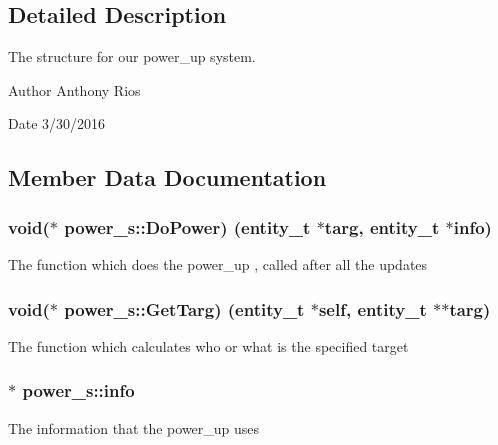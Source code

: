\subsection{Detailed Description}
The structure for our power\+\_\+up system.

\begin{DoxyAuthor}{Author}
Anthony Rios 
\end{DoxyAuthor}
\begin{DoxyDate}{Date}
3/30/2016 
\end{DoxyDate}


\subsection{Member Data Documentation}
\subsubsection[{\texorpdfstring{Do\+Power}{DoPower}}]{\setlength{\rightskip}{0pt plus 5cm}void($\ast$ power\+\_\+s\+::\+Do\+Power) ({\bf entity\+\_\+t} $\ast$targ, {\bf entity\+\_\+t} $\ast${\bf info})}\hypertarget{structpower__s_a098d549981525670c9a0547af9252323}{}\label{structpower__s_a098d549981525670c9a0547af9252323}
The function which does the power\+\_\+up , called after all the updates 
\subsubsection[{\texorpdfstring{Get\+Targ}{GetTarg}}]{\setlength{\rightskip}{0pt plus 5cm}void($\ast$ power\+\_\+s\+::\+Get\+Targ) ({\bf entity\+\_\+t} $\ast$self, {\bf entity\+\_\+t} $\ast$$\ast$targ)}\hypertarget{structpower__s_a28669829daf806ea3571ea2d625bd8a3}{}\label{structpower__s_a28669829daf806ea3571ea2d625bd8a3}
The function which calculates who or what is the specified target 
\subsubsection[{\texorpdfstring{info}{info}}]{$\ast$ power\+\_\+s\+::info}\hypertarget{structpower__s_a32cc3097e3d59f2777c519bce21b12dc}{}\label{structpower__s_a32cc3097e3d59f2777c519bce21b12dc}
The information that the power\+\_\+up uses 
